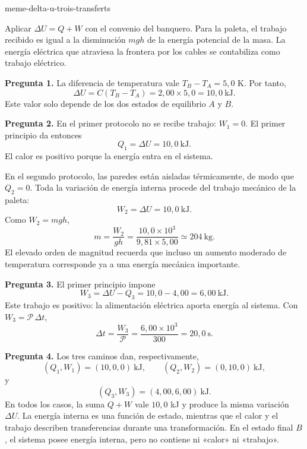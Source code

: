 \begin{exo}{meme-delta-u-trois-transferts}
\begin{indication}
Aplicar $\Delta U=Q+W$ con el convenio del banquero. Para la paleta, el trabajo
recibido es igual a la disminución $mgh$ de la energía potencial de la masa.
La energía eléctrica que atraviesa la frontera por los cables se contabiliza
como trabajo eléctrico.
\end{indication}

\begin{solution}
\textbf{Pregunta 1.} La diferencia de temperatura vale $T_B-T_A=5{,}0$ K. Por tanto,
\[\Delta U=C(T_B-T_A)=2{,}00\times5{,}0=10{,}0\ \mathrm{kJ}.\]
Este valor solo depende de los dos estados de equilibrio $A$ y $B$.

\textbf{Pregunta 2.} En el primer protocolo no se recibe trabajo: $W_1=0$.
El primer principio da entonces
\[Q_1=\Delta U=10{,}0\ \mathrm{kJ}.\]
El calor es positivo porque la energía entra en el sistema.

En el segundo protocolo, las paredes están aisladas térmicamente, de modo que
$Q_2=0$. Toda la variación de energía interna procede del trabajo mecánico de la paleta:
\[W_2=\Delta U=10{,}0\ \mathrm{kJ}.\]
Como $W_2=mgh$,
\[m=\frac{W_2}{gh}=\frac{10{,}0\times10^3}{9{,}81\times5{,}00}\simeq204\ \mathrm{kg}.\]
El elevado orden de magnitud recuerda que incluso un aumento moderado de
temperatura corresponde ya a una energía mecánica importante.

\textbf{Pregunta 3.} El primer principio impone
\[W_3=\Delta U-Q_3=10{,}0-4{,}00=6{,}00\ \mathrm{kJ}.\]
Este trabajo es positivo: la alimentación eléctrica aporta energía al sistema.
Con $W_3=\mathcal P\,\Delta t$,
\[\Delta t=\frac{W_3}{\mathcal P}=\frac{6{,}00\times10^3}{300}=20{,}0\ \mathrm{s}.\]

\textbf{Pregunta 4.} Los tres caminos dan, respectivamente,
\[(Q_1,W_1)=(10{,}0,0)\ \mathrm{kJ},\qquad(Q_2,W_2)=(0,10{,}0)\ \mathrm{kJ},\]
y
\[(Q_3,W_3)=(4{,}00,6{,}00)\ \mathrm{kJ}.\]
En todos los casos, la suma $Q+W$ vale $10{,}0$ kJ y produce la misma variación
$\Delta U$. La energía interna es una función de estado, mientras que el calor
y el trabajo describen transferencias durante una transformación. En el estado
final $B$, el sistema posee energía interna, pero no contiene ni «calor» ni «trabajo».
\end{solution}
\end{exo}

